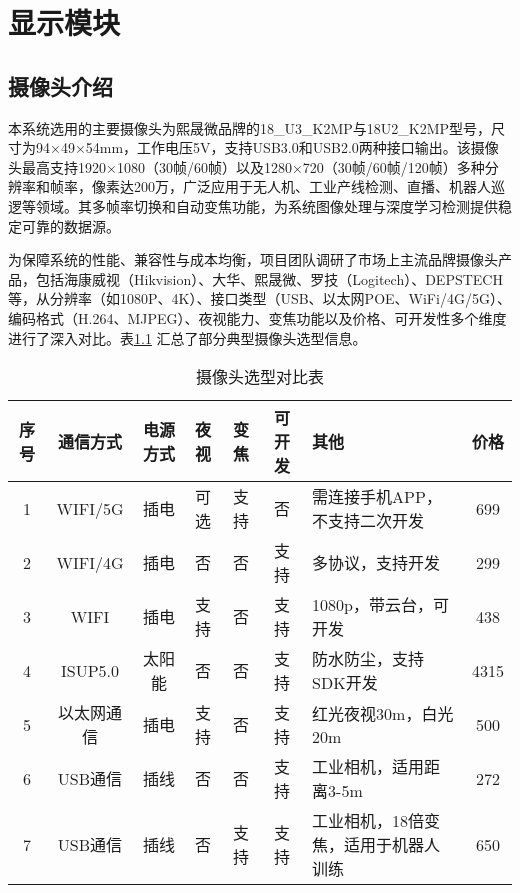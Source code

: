 \chapter{显示模块}

\section{摄像头介绍}

本系统选用的主要摄像头为熙晟微品牌的18\_U3\_K2MP与18U2\_K2MP型号，尺寸为94×49×54mm，工作电压5V，支持USB3.0和USB2.0两种接口输出。该摄像头最高支持1920×1080（30帧/60帧）以及1280×720（30帧/60帧/120帧）多种分辨率和帧率，像素达200万，广泛应用于无人机、工业产线检测、直播、机器人巡逻等领域。其多帧率切换和自动变焦功能，为系统图像处理与深度学习检测提供稳定可靠的数据源。

为保障系统的性能、兼容性与成本均衡，项目团队调研了市场上主流品牌摄像头产品，包括海康威视（Hikvision）、大华、熙晟微、罗技（Logitech）、DEPSTECH 等，从分辨率（如1080P、4K）、接口类型（USB、以太网POE、WiFi/4G/5G）、编码格式（H.264、MJPEG）、夜视能力、变焦功能以及价格、可开发性多个维度进行了深入对比。表\ref{tab:camera_comparison} 汇总了部分典型摄像头选型信息。

\begin{table}[H]
    \centering
    \caption{摄像头选型对比表}
    \label{tab:camera_comparison}
    \renewcommand{\arraystretch}{1.2} %
    \setlength{\tabcolsep}{3pt} %
    \begin{tabular}{|c|c|c|c|c|c|p{4cm}|c|}
        \hline
        序号 & 通信方式 & 电源方式 & 夜视 & 变焦 & 可开发 & 其他 & 价格 \\
        \hline
        1 & WIFI/5G & 插电 & 可选 & 支持 & 否 & 需连接手机APP，不支持二次开发 & 699 \\
        \hline
        2 & WIFI/4G & 插电 & 否 & 否 & 支持 & 多协议，支持开发 & 299 \\
        \hline
        3 & WIFI & 插电 & 支持 & 否 & 支持 & 1080p，带云台，可开发 & 438 \\
        \hline
        4 & ISUP5.0 & 太阳能 & 否 & 否 & 支持 & 防水防尘，支持SDK开发 & 4315 \\
        \hline
        5 & 以太网通信 & 插电 & 支持 & 否 & 支持 & 红光夜视30m，白光20m & 500 \\
        \hline
        6 & USB通信 & 插线 & 否 & 否 & 支持 & 工业相机，适用距离3-5m & 272 \\
        \hline
        7 & USB通信 & 插线 & 否 & 支持 & 支持 & 工业相机，18倍变焦，适用于机器人训练 & 650 \\
        \hline
    \end{tabular}
\end{table}

